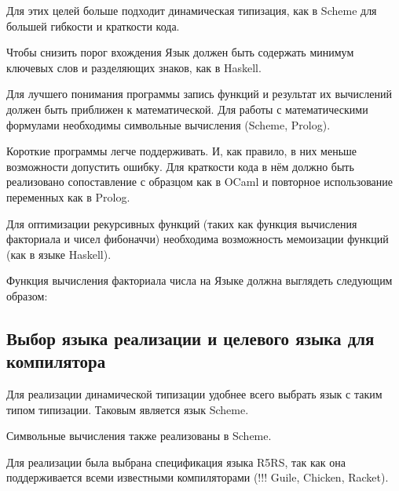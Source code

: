         Для этих целей больше подходит динамическая типизация, как в Scheme для большей гибкости и краткости кода.

        Чтобы снизить порог вхождения Язык должен быть содержать минимум ключевых слов и разделяющих знаков, как в Haskell.

        Для лучшего понимания программы запись функций и результат их вычислений должен быть приближен к математической.
        Для работы с математическими формулами необходимы символьные вычисления (Scheme, Prolog).

        Короткие программы легче поддерживать.
        И, как правило, в них меньше возможности допустить ошибку.
        Для краткости кода в нём должно быть реализовано сопоставление с образцом как в OCaml и повторное использование переменных как в Prolog.

        Для оптимизации рекурсивных функций (таких как функция вычисления факториала и чисел фибоначчи) необходима возможность мемоизации функций (как в языке Haskell).

        Функция вычисления факториала числа на Языке должна выглядеть следующим образом:

        

    \subsection{Выбор языка реализации и целевого языка для компилятора}
        Для реализации динамической типизации удобнее всего выбрать язык с таким типом типизации.
        Таковым является язык Scheme.

        Символьные вычисления также реализованы в Scheme.

        Для реализации была выбрана спецификация языка R5RS, так как она поддерживается всеми известными компиляторами (!!! Guile, Chicken, Racket).
